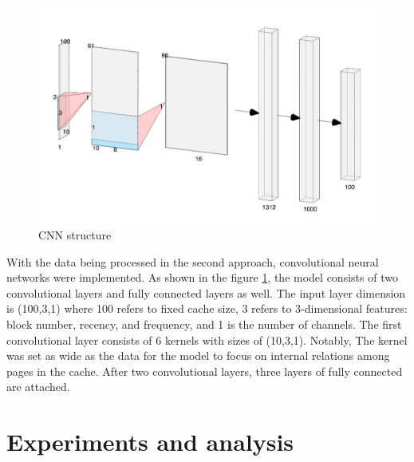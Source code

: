 \documentclass[letterpaper,twocolumn,10pt]{article}
\begin{document}
\begin{figure}[!ht]
	\centering 
	\includegraphics[width=0.38\textheight]{NN.png}
	\caption{CNN structure}
	\label{fig:nn_design}
\end{figure}


With the data being processed in the second approach, convolutional neural networks were implemented. As shown in the figure \ref{fig:nn_design}, the model consists of two convolutional layers and fully connected layers as well. The input layer dimension is (100,3,1) where 100 refers to fixed cache size, 3 refers to 3-dimensional features: block number, recency, and frequency, and 1 is the number of channels. The first convolutional layer consists of 6 kernels with sizes of (10,3,1). Notably, The kernel was set as wide as the data for the model to focus on internal relations among pages in the cache. After two convolutional layers, three layers of fully connected are attached.

\section{Experiments and analysis}
\end{document}

